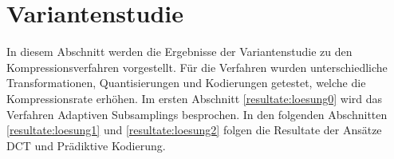 \section{Variantenstudie}\label{resultate}
In diesem Abschnitt werden die Ergebnisse der Variantenstudie zu den Kompressionsverfahren vorgestellt. Für die Verfahren wurden unterschiedliche Transformationen, Quantisierungen und Kodierungen getestet, welche die Kompressionsrate erhöhen. Im ersten Abschnitt \ref{resultate:loesung0} wird das Verfahren Adaptiven Subsamplings besprochen. In den folgenden Abschnitten \ref{resultate:loesung1} und \ref{resultate:loesung2} folgen die Resultate der Ansätze DCT und Prädiktive Kodierung.


\pagebreak

\pagebreak

